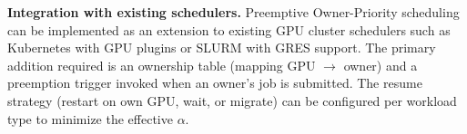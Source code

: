 
\textbf{Integration with existing schedulers.}
Preemptive Owner-Priority scheduling can be implemented as an extension
to existing GPU cluster schedulers such as Kubernetes with GPU plugins
or SLURM with GRES support.
The primary addition required is an ownership table (mapping GPU $\to$ owner)
and a preemption trigger invoked when an owner's job is submitted.
The resume strategy (restart on own GPU, wait, or migrate) can be
configured per workload type to minimize the effective $\alpha$.

